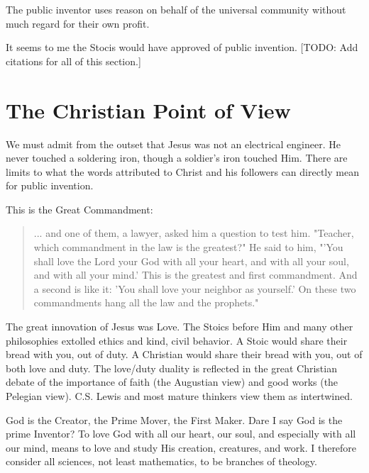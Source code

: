 \documentclass[
	fontsize=10pt, %
	twoside=false, %
	secnumdepth=1, %
]{kaobook}
\begin{document}
The public inventor uses reason on behalf of the
universal community without much regard for their own
profit.

It seems to me the Stocis would have approved of public invention.
[TODO: Add citations for all of this section.]

\chapter{The Christian Point of View}


We must admit from the outset that Jesus was not
an electrical engineer.
He never touched a soldering iron, though a soldier's iron touched Him.
There are limits to what the words attributed to Christ and his followers
can directly mean for public invention.

This is the Great Commandment:
\blockquote{
... and one of them, a lawyer, asked him a question to test
him. "Teacher, which commandment in the law is the greatest?" He said
to him, "'You shall love the Lord your God with all your heart, and
with all your soul, and with all your mind.' This is the greatest and
first commandment. And a second is like it: 'You shall love your
neighbor as yourself.' On these two commandments hang all the law and
the prophets."
}

The great innovation of Jesus was Love.
The Stoics before Him and many other philosophies extolled ethics
and kind, civil behavior.
A Stoic would share their bread with you, out of duty.
A Christian would share their bread with you, out of both love and duty.
The love/duty duality is reflected in the great Christian debate
of the importance of faith (the Augustian view) and good works (the Pelegian view).
C.S. Lewis and most mature thinkers view them as intertwined.

God is the Creator, the Prime Mover, the First Maker.
Dare I say God is the prime Inventor?
To love God with all our heart, our soul, and especially
with all our mind, means to love and study His creation, creatures, and work.
I therefore consider all sciences, not least mathematics, to be branches of theology.
\end{document}
